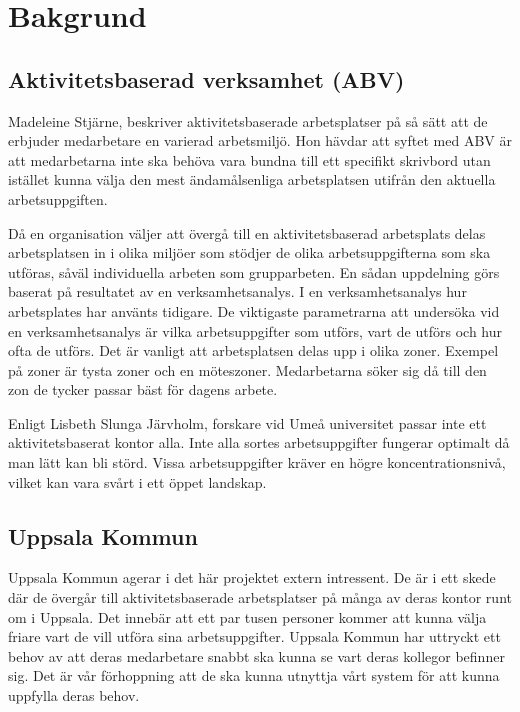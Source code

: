 \documentclass[swedish, a4paper,12pt]{article}
\begin{document}
\section{Bakgrund}
\subsection{Aktivitetsbaserad verksamhet (ABV)}
Madeleine Stjärne, beskriver aktivitetsbaserade arbetsplatser på så sätt att de erbjuder medarbetare en varierad arbetsmiljö.\cite{ABV} Hon hävdar att syftet med ABV är att medarbetarna inte ska behöva vara bundna till ett specifikt skrivbord utan istället kunna välja den mest ändamålsenliga arbetsplatsen utifrån den aktuella arbetsuppgiften. %

Då en organisation väljer att övergå till en aktivitetsbaserad arbetsplats
delas arbetsplatsen in i olika miljöer som stödjer de olika arbetsuppgifterna som ska utföras, såväl individuella arbeten som grupparbeten. En sådan uppdelning görs baserat på resultatet av en verksamhetsanalys. I en verksamhetsanalys hur arbetsplates har använts tidigare. De viktigaste parametrarna att undersöka vid en verksamhetsanalys är vilka arbetsuppgifter som utförs, vart de utförs och hur ofta de utförs.\cite{ABV}
Det är vanligt att arbetsplatsen delas upp i olika zoner. Exempel på zoner är tysta zoner och en möteszoner. Medarbetarna söker sig då till den zon de tycker passar bäst för dagens arbete.

Enligt Lisbeth Slunga Järvholm, forskare vid Umeå universitet passar inte ett aktivitetsbaserat kontor alla. Inte alla sortes arbetsuppgifter fungerar optimalt då man lätt kan bli störd. Vissa arbetsuppgifter kräver en högre koncentrationsnivå, vilket kan vara svårt i ett öppet landskap.\cite{passarInteAlla}

\subsection{Uppsala Kommun}
Uppsala Kommun agerar i det här projektet extern intressent. De är i ett skede där de övergår till aktivitetsbaserade arbetsplatser på många av deras kontor runt om i Uppsala. Det innebär att %
ett par tusen personer kommer att kunna välja friare vart de vill utföra sina arbetsuppgifter. Uppsala Kommun har uttryckt ett behov av att deras medarbetare snabbt ska kunna se vart deras kollegor befinner sig. Det är vår förhoppning att de ska kunna utnyttja vårt system för att kunna uppfylla deras behov.
\end{document}
